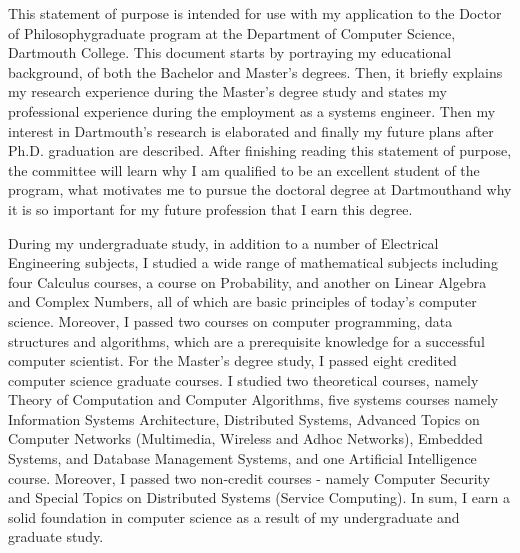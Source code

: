 \documentclass[a4paper,10pt]{report}
\newcommand{\university}{Dartmouth College}
\newcommand{\department}{Department of Computer Science}
\newcommand{\uniabbre}{Dartmouth}
\newcommand{\degree}{Doctor of Philosophy}
\begin{document}

\vspace{0.4cm}
This statement of purpose is intended for use with my application to the \degree \space graduate program at the \department, \university. This document starts by portraying my educational background, of both the Bachelor and Master's degrees. Then, it briefly explains my research experience during the Master's degree study and states my professional experience during the employment as a systems engineer. Then my interest in \uniabbre's research is elaborated and finally my future plans after Ph.D. graduation are described. After finishing reading this statement of purpose, the committee will learn why I am qualified to be an excellent student of the program, what motivates me to pursue the doctoral degree at \uniabbre \space and why it is so important for my future profession that I earn this degree.

\vspace{0.2cm}
During my undergraduate study, in addition to a number of Electrical Engineering subjects, I studied a wide range of mathematical subjects including four Calculus courses, a course on Probability, and another on Linear Algebra and Complex Numbers, all of which are basic principles of today's computer science. Moreover, I passed two courses on computer programming, data structures and algorithms, which are a prerequisite knowledge for a successful computer scientist. For the Master's degree study, I passed eight credited computer science graduate courses. I studied two theoretical courses, namely Theory of Computation and Computer Algorithms, five systems courses namely Information Systems Architecture, Distributed Systems, Advanced Topics on Computer Networks (Multimedia, Wireless and Adhoc Networks), Embedded Systems, and Database Management Systems, and one Artificial Intelligence course. Moreover, I passed two non-credit courses - namely Computer Security and Special Topics on Distributed Systems (Service Computing). In sum, I earn a solid foundation in computer science as a result of my undergraduate and graduate study. 
\end{document}
